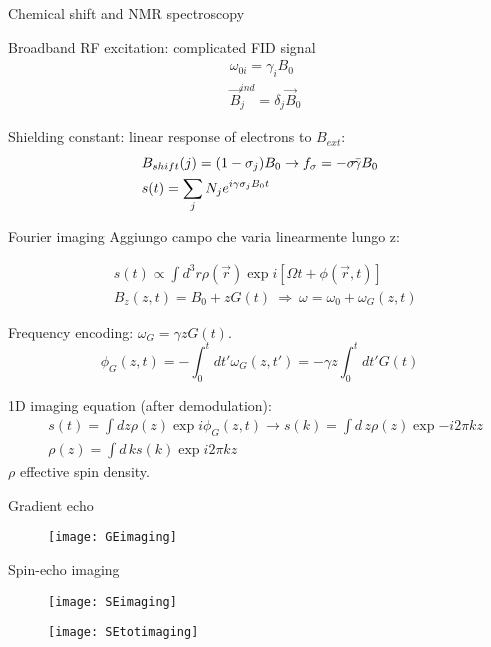 \begin{frame}{Chemical shift and NMR spectroscopy}

Broadband RF excitation: complicated FID signal
\begin{align*}
&\omega_{0i}=\gamma_iB_0\\
&\vec{B}_j^{ind}=\delta_j\vec{B}_0
\end{align*}

Shielding constant: linear response of electrons to $B_{ext}$:
\begin{align*}
&B_{shift}(j)=(1-\sigma_j)B_0\to f_{\sigma}=-\sigma\gammabar B_0\\
&s(t)=\sum_jN_j\exp{i\gamma\sigma_jB_0t}
\end{align*}
\end{frame}


\begin{frame}{Fourier imaging}
Aggiungo campo che varia linearmente lungo z:

\begin{align*}
&s(t)\propto\int d^3 r\rho(\vec{r})\exp{i[\Omega t+\phi(\vec{r},t)]}\\
&B_z(z,t)=B_0+zG(t)\ \Rightarrow\ \omega=\omega_0+\omega_G(z,t)
\end{align*}

Frequency encoding: $\omega_G=\gamma zG(t)$.
\begin{equation*}
\phi_G(z,t)=-\int_0^td t'\omega_G(z,t')=-\gamma z\int_0^td t'G(t)
\end{equation*}

1D imaging equation (after demodulation):
\begin{align*}
&s(t)=\int d z\rho(z)\exp{i\phi_G(z,t)}\to s(k)=\int d\,z\rho(z)\exp{-i2\pi kz}\\
&\rho(z)=\int d\,ks(k)\exp{i2\pi kz}
\end{align*}
$\rho$ effective spin density.

\end{frame}

\begin{frame}{Gradient echo}
\begin{figure}[!ht]\texttt{[image: GEimaging]}\end{figure}
\end{frame}

\begin{frame}[allowframebreaks]{Spin-echo imaging}
\begin{figure}[!ht]\texttt{[image: SEimaging]}\end{figure}
\begin{figure}[!ht]\texttt{[image: SEtotimaging]}\end{figure}
\end{frame}

